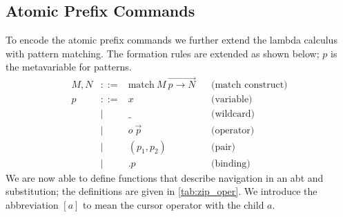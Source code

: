 \documentclass[sigplan]{acmart}
\newcommand{\abt}{\textsf{abt}\xspace}
\begin{document}

\subsection{Atomic Prefix Commands}

To encode the atomic prefix commands we further extend the lambda
calculus with pattern matching. The formation rules are extended as
shown below; $p$ is the metavariable for patterns.
\begin{align*}
    M, N & ::= & \text{match}\ M\ \overrightarrow{p \to N} && \text{(match construct)}
    \\
    p & ::= & x              & & \text{(variable)} \\
      & |   & \_             && \text{(wildcard)} \\
      & |   & o\ \Vec{p}     && \text{(operator)} \\
      & |   & (p_1, p_2)     && \text{(pair)} \\
         & |   & .p             && \text{(binding)}
\end{align*}
%
We are now able to define functions that describe navigation in an
\abt and substitution; the definitions are given in
\cref{tab:zip_oper}. We introduce the abbreviation $[a]$ to mean the
cursor operator with the child $a$.
\end{document}
